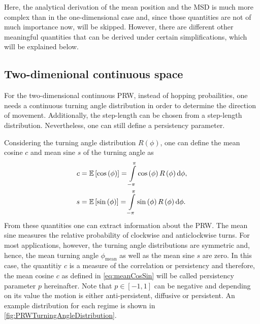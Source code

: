 Here, the analytical derivation of the mean position and the \acs{MSD} is much more complex than in the one-dimensional case and, since those quantities are not of much importance now, will be skipped. However, there are different other meaningful quantities that can be derived under certain simplifications, which will be explained below.

\subsection{Two-dimenional continuous space}
For the two-dimensional continuous \acs{PRW}, instead of hopping probailities, one needs a continuous turning angle distribution in order to determine the direction of movement. Additionally, the step-length can be chosen from a step-length distribution. Nevertheless, one can still define a persistency parameter.

Considering the turning angle distribution $R\left(\phi\right)$, one can define the mean cosine $c$ and mean sine $s$ of the turning angle as
\begin{equation}
 \label{eq:meanCosSin}
 \begin{aligned}
  c &= \mathbb{E}\left[\cos\left(\phi\right)\right] = \int\displaylimits^\pi_{-\pi} \cos\left(\phi\right)R\left(\phi\right)\textrm{d}\phi,
  \\
  s &= \mathbb{E}\left[\sin\left(\phi\right)\right] = \int\displaylimits^\pi_{-\pi} \sin\left(\phi\right)R\left(\phi\right)\textrm{d}\phi.
 \end{aligned}
\end{equation}
From these quantities one can extract information about the \acs{PRW}. The mean sine measures the relative probability of clockwise and anticlockwise turns. For most applications, however, the turning angle distributions are symmetric and, hence, the mean turning angle $\phi_{\textrm{mean}}$ as well as the mean sine $s$ are zero. In this case, the quantitiy $c$ is a measure of the correlation or persistency and therefore, the mean cosine $c$ as defined in \autoref{eq:meanCosSin} will be called persistency parameter $p$ hereinafter. Note that $p\in\left[-1,1\right]$ can be negative and depending on its value the motion is either anti-persistent, diffusive or persistent. An example distribution for each regime is shown in \autoref{fig:PRWTurningAngleDistribution}.

